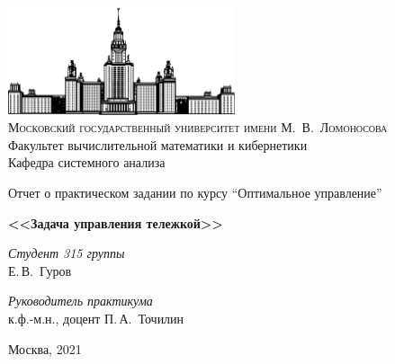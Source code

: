 \documentclass[10pt]{article}
\begin{document}
\thispagestyle{empty}

\begin{center}
\ \vspace{-3cm}

\includegraphics[width=0.5\textwidth]{msu.png}\\
{\scshape Московский государственный университет имени М.~В.~Ломоносова}\\
Факультет вычислительной математики и кибернетики\\
Кафедра системного анализа

\vfill

{\LARGE Отчет о практическом задании по курсу ``Оптимальное управление'' }

\vspace{1cm}

{\Huge\bfseries <<Задача управления тележкой>>}
\end{center}

\vspace{1cm}

\begin{flushright}
  \large
  \textit{Студент 315 группы}\\
  Е.\,В.~Гуров

  \vspace{5mm}

  \textit{Руководитель практикума}\\
  к.ф.-м.н., доцент П.\,А.~Точилин
\end{flushright}

\vfill

\begin{center}
Москва, 2021
\end{center}
\newpage

\tableofcontents
\newpage
\end{document}
